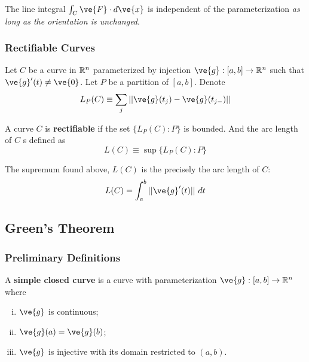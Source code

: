 \documentclass[11pt]{article}
\begin{document}
			\begin{proposition}
				The line integral $\int_C \ve{F}\cdot d\ve{x}$ is independent of the parameterization \emph{as long as the orientation is unchanged}.
			\end{proposition}
			
		\subsubsection{Rectifiable Curves}
			\begin{remark}
				Let $C$ be a curve in $\mathbb{R}^n$ parameterized by injection $\ve{g}: [a, b] \to \R^n$ such that $\ve{g}'(t) \neq \ve{0}$. Let $P$ be a partition of $[a, b]$. Denote
				\begin{equation}
					L_P(C) \equiv \sum_{j} ||\ve{g}(t_j) - \ve{g}(t_{j-})||
				\end{equation}
			\end{remark}
			
			\begin{definition}
				A curve $C$ is \textbf{rectifiable} if the set $\{L_P(C):P\}$ is bounded. And the arc length of $C$ s defined as 
				\begin{equation}
					L(C) \equiv \sup \{L_P(C):P\}
				\end{equation}
			\end{definition}
			
			\begin{theorem}
				The supremum found above, $L(C)$ is the precisely the arc length of $C$:
				\begin{equation}
					L(C) = \int_a^b ||\ve{g}'(t)||\ dt
				\end{equation}
			\end{theorem}
		
		\subsection{Green's Theorem}
			\subsubsection{Preliminary Definitions}
				\begin{definition}
					A \textbf{simple closed curve} is a curve with parameterization $\ve{g}: [a, b] \to \R^n$ where
					\begin{enumerate}[(i)]
						\item $\ve{g}$ is continuous;
						\item $\ve{g}(a) = \ve{g}(b)$;
						\item $\ve{g}$ is injective with its domain restricted to $(a, b)$.
					\end{enumerate}
				\end{definition}
				
\end{document}
